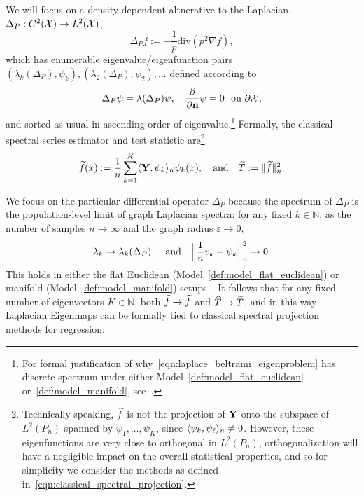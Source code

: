 We will focus on a density-dependent altnerative to the Laplacian,  $\Delta_P:C^2(\mathcal{X}) \to L^2(\mathcal{X})$,
\begin{equation}
\label{eqn:laplace_beltrami}
\Delta_Pf := -\frac{1}{p} \mathrm{div}(p^2\nabla f),
\end{equation}
which has enumerable eigenvalue/eigenfunction pairs $(\lambda_k(\Delta_P),\psi_k),(\lambda_2(\Delta_P),\psi_2),\ldots$ defined according to
\begin{equation}
\label{eqn:laplace_beltrami_eigenproblem}
\Delta_P\psi = \lambda(\Delta_P) \psi, \quad \frac{\partial}{\partial{\bf n}}\psi = 0~~\textrm{on $\partial \mathcal{X}$,}
\end{equation}
and sorted as usual in ascending order of eigenvalue.\footnote{For formal justification of why~\eqref{eqn:laplace_beltrami_eigenproblem} has discrete spectrum under either Model~\ref{def:model_flat_euclidean} or~\ref{def:model_manifold}, see~\cite{garciatrillos18,trillos2019}.} Formally, the classical spectral series estimator and test statistic are\footnote{Technically speaking, $\widetilde{f}$ is not the projection of ${\bf Y}$ onto the subspace of $L^2(P_n)$ spanned by $\psi_1,\ldots,\psi_K$, since $\langle \psi_k, \psi_{\ell} \rangle_n \neq 0$. However, these eigenfunctions are very close to orthogonal in $L^2(P_n)$, orthogonalization will have a negligible impact on the overall statistical properties, and so for simplicity we consider the methods as defined in~\eqref{eqn:classical_spectral_projection}.}
\begin{equation}
\label{eqn:classical_spectral_projection}
\widetilde{f}(x) := \frac{1}{n}\sum_{k = 1}^{K} \langle {\bf Y}, \psi_k \rangle_{n} \psi_k(x),\quad\textrm{and}\quad \widetilde{T} := \|\widetilde{f}\|_n^2.
\end{equation}

We focus on the particular differential operator $\Delta_P$ because the spectrum of $\Delta_P$ is the population-level limit of graph Laplacian spectra: for any fixed $k \in \mathbb{N}$, as the number of samples $n \to \infty$ and the graph radius $\varepsilon \to 0$,
\begin{equation}
\lambda_k \to \lambda_k(\Delta_P), \quad\textrm{and}\quad \Bigl\|\frac{1}{n}v_k - \psi_k\Bigr\|_n^2 \to 0.
\end{equation}
This holds in either the flat Euclidean (Model~\ref{def:model_flat_euclidean}) or manifold (Model~\ref{def:model_manifold}) setups~\citep{garciatrillos18,trillos2019}. It follows that for any fixed number of eigenvectors $K \in \mathbb{N}$, both $\widehat{f} \to \widetilde{f}$ and $\widehat{T} \to \widetilde{T}$, and in this way Laplacian Eigenmaps can be formally tied to classical spectral projection methods for regression.
 
